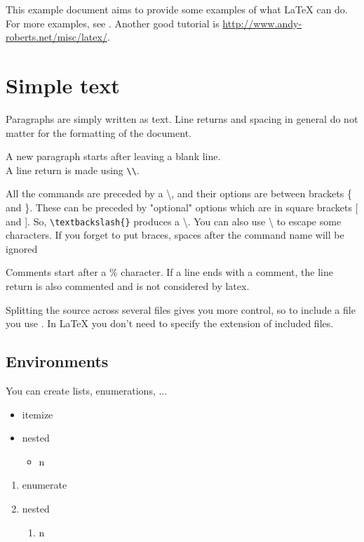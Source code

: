 
This example document aims to provide some examples of what \LaTeX{} can do.
For more examples, see  \cite{wikibook-latex}.
Another good tutorial is \url{http://www.andy-roberts.net/misc/latex/}.

\section{Simple text}

Paragraphs are simply written as text.
Line returns and spacing in general do not matter for the formatting of the
document.

A new paragraph starts after leaving a blank line. \\
A line return is made using \lstinline$\\$.

All the commands are preceded by a \textbackslash{}, and their options are
between brackets \{ and \}.
These can be preceded by "optional" options which are in square brackets [ and
].
So, \lstinline$\textbackslash{}$ produces a \textbackslash{}.
You can also use \textbackslash{} to escape some characters.
If you forget to put braces, spaces after the command name will be ignored

Comments start after a \% character.
If a line ends with a comment, the line return is also commented and is not
considered by latex.

Splitting the source across several files gives you more control, so to include
a file you use \lstinline$$.
In \LaTeX{} you don't need to specify the extension of included files.

\subsection{Environments}

You can create lists, enumerations, ...

\begin{itemize}
\item itemize
\item nested
	\begin{itemize}
	\item n
	\end{itemize}
\end{itemize}

\begin{enumerate}
\item enumerate
\item nested
	\begin{enumerate}
	\item n
	\end{enumerate}
\end{enumerate}

